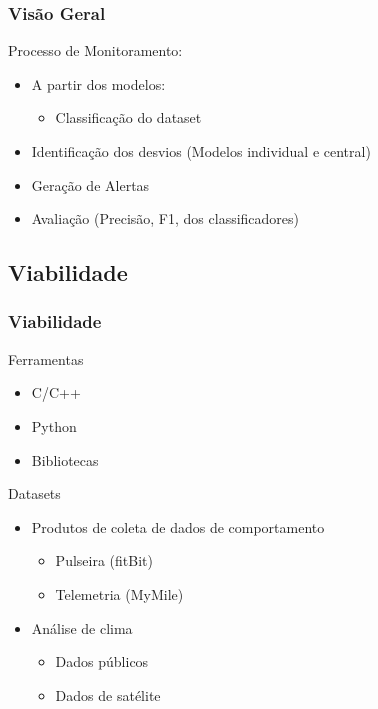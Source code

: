 \documentclass[hyperref={pdfpagelabels=false}]{beamer}
\begin{document}
\begin{frame}
	\frametitle{Visão Geral}
    Processo de Monitoramento: \begin{itemize}
	    \item A partir dos modelos: \begin{itemize}
	    	\item Classificação do dataset
	    \end{itemize}
        \item Identificação dos desvios (Modelos individual e central)
        \item Geração de Alertas
        \item Avaliação (Precisão, F1, dos classificadores)
	\end{itemize}
    
\end{frame}
       
\subsection{Viabilidade}  

\begin{frame}
	\frametitle{Viabilidade}
    
    \Large{Ferramentas}
    \normalsize
    \begin{itemize}
   		\item C/C++
		\item Python
        \item Bibliotecas 
    \end{itemize}
    \Large{Datasets}
    \normalsize
    \begin{itemize}
     	\item Produtos de coleta de dados de comportamento \begin{itemize}
        	\item Pulseira (fitBit)
        	\item Telemetria (MyMile)
        \end{itemize}
        \item Análise de clima \begin{itemize}
        	\item Dados públicos
            \item Dados de satélite
        \end{itemize}
    \end{itemize}
   
\end{frame}
\end{document}
